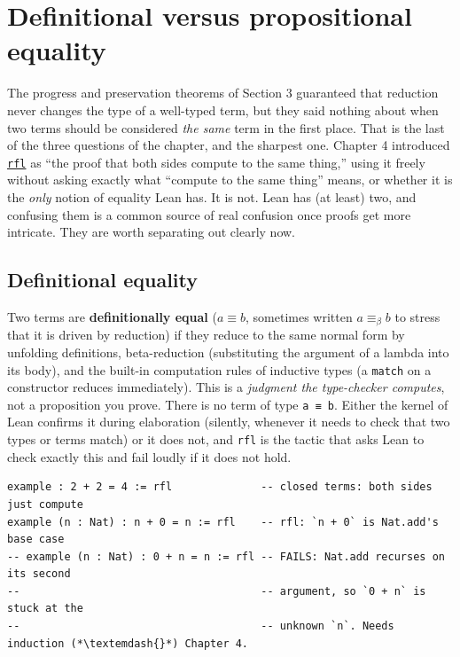 \section{Definitional versus propositional equality}\label{sec:05-rigor-check:04-defeq-vs-propeq:1}

The progress and preservation theorems of Section 3 guaranteed that reduction never changes the type of a well-typed term, but they said nothing about when two terms should be considered \emph{the same} term in the first place. That is the last of the three questions of the chapter, and the sharpest one. Chapter 4 introduced \href{https://lean-lang.org/doc/reference/latest/Tactic-Proofs/Tactic-Reference/}{\texttt{rfl}} as ``the proof that both sides compute to the same thing,'' using it freely without asking exactly what ``compute to the same thing'' means, or whether it is the \emph{only} notion of equality Lean has. It is not. Lean has (at least) two, and confusing them is a common source of real confusion once proofs get more intricate. They are worth separating out clearly now.

\subsection{Definitional equality}\label{sec:05-rigor-check:04-defeq-vs-propeq:2}

Two terms are \textbf{definitionally equal} (\(a \equiv b\), sometimes written \(a \equiv_\beta b\) to stress that it is driven by reduction) if they reduce to the same normal form by unfolding definitions, beta-reduction (substituting the argument of a lambda into its body), and the built-in computation rules of inductive types (a \texttt{match} on a constructor reduces immediately). This is a \emph{judgment the type-checker computes}, not a proposition you prove. There is no term of type \texttt{a ≡ b}. Either the kernel of Lean confirms it during elaboration (silently, whenever it needs to check that two types or terms match) or it does not, and \texttt{rfl} is the tactic that asks Lean to check exactly this and fail loudly if it does not hold.

\begin{lstlisting}
example : 2 + 2 = 4 := rfl              -- closed terms: both sides just compute
example (n : Nat) : n + 0 = n := rfl    -- rfl: `n + 0` is Nat.add's base case
-- example (n : Nat) : 0 + n = n := rfl -- FAILS: Nat.add recurses on its second
--                                      -- argument, so `0 + n` is stuck at the
--                                      -- unknown `n`. Needs induction (*\textemdash{}*) Chapter 4.
\end{lstlisting}

